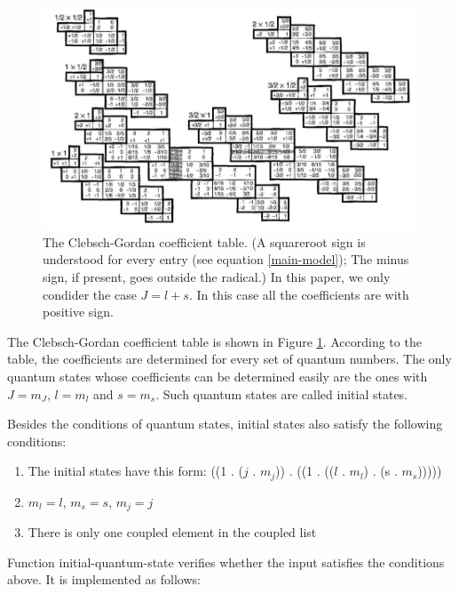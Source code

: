 \documentclass[12pt,journal,compsoc]{IEEEtran}
\begin{document}
\begin{figure}[!t]

\centering
\includegraphics[width=6in]{table}
\caption{The Clebsch-Gordan coefficient table.\cite{griffiths} (A squareroot sign is understood for every entry (see equation \ref{main-model}); The minus sign, if present, goes outside the radical.) In this paper, we only condider the case $J=l+s$. In this case all the coefficients are with positive sign.}
\label{table}
\end{figure}

The Clebsch-Gordan coefficient table is shown in Figure \ref{table}. According to the table, the coefficients are determined for every set of quantum numbers. The only quantum states whose coefficients can be determined easily are the ones with $J=m_J$, $l=m_l$ and $s=m_s$. Such quantum states are called initial states.

Besides the conditions of quantum states, initial states also satisfy the following conditions:

\begin{enumerate}

\item The initial states have this form: ((1 . ($j$ . $m_j$)) . ((1 . (($l$ . $m_l$) . (s . $m_s$)))))

\item $m_l= l$, $m_s=s$, $m_j = j$

\item There is only one coupled element in the coupled list

\end{enumerate}

Function initial-quantum-state verifies whether the input satisfies the conditions above. It is implemented as follows:
\end{document}
